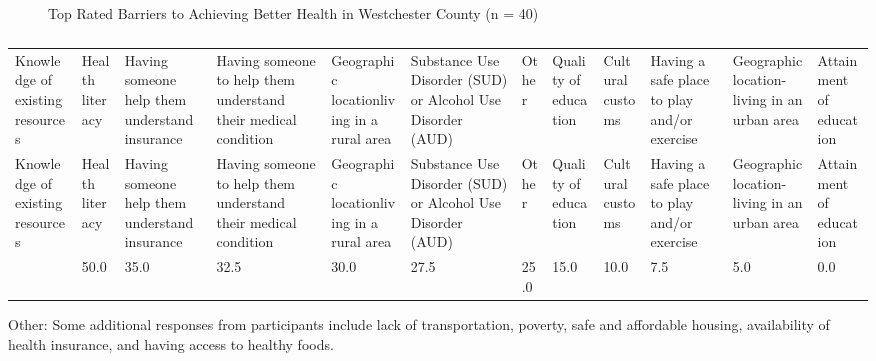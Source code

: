 \documentclass[
  english,
  letterpaper,
]{report}
\begin{document}
\begin{figure}


\caption{\label{fig-wc-achieve-health}Top Rated Barriers to Achieving
Better Health in Westchester County (n = 40)}

\end{figure}%

\begin{longtable}[]{@{}llllllllllll@{}}

\caption{\label{tbl-wc-achieve-health}Top Rated Barriers to Achieving
Better Health in Westchester County (n = 40)}

\tabularnewline

\caption{}\label{T_bda61}\tabularnewline
\toprule\noalign{}
Knowledge of existing resources & Health literacy & Having someone help
them understand insurance & Having someone to help them understand their
medical condition & Geographic locationliving in a rural area &
Substance Use Disorder (SUD) or Alcohol Use Disorder (AUD) & Other &
Quality of education & Cultural customs & Having a safe place to play
and/or exercise & Geographic location- living in an urban area &
Attainment of education \\
\midrule\noalign{}
\endfirsthead
\toprule\noalign{}
Knowledge of existing resources & Health literacy & Having someone help
them understand insurance & Having someone to help them understand their
medical condition & Geographic locationliving in a rural area &
Substance Use Disorder (SUD) or Alcohol Use Disorder (AUD) & Other &
Quality of education & Cultural customs & Having a safe place to play
and/or exercise & Geographic location- living in an urban area &
Attainment of education \\
\midrule\noalign{}
\endhead
\bottomrule\noalign{}
\endlastfoot
62.5 & 50.0 & 35.0 & 32.5 & 30.0 & 27.5 & 25.0 & 15.0 & 10.0 & 7.5 & 5.0
& 0.0 \\

\end{longtable}

\begin{tcolorbox}[enhanced jigsaw, breakable, leftrule=.75mm, title=\textcolor{quarto-callout-note-color}{\faInfo}\hspace{0.5em}{Note}, bottomrule=.15mm, opacityback=0, left=2mm, colback=white, bottomtitle=1mm, coltitle=black, colbacktitle=quarto-callout-note-color!10!white, colframe=quarto-callout-note-color-frame, opacitybacktitle=0.6, toptitle=1mm, titlerule=0mm, arc=.35mm, rightrule=.15mm, toprule=.15mm]

Other: Some additional responses from participants include lack of
transportation, poverty, safe and affordable housing, availability of
health insurance, and having access to healthy foods.

\end{tcolorbox}
\end{document}
